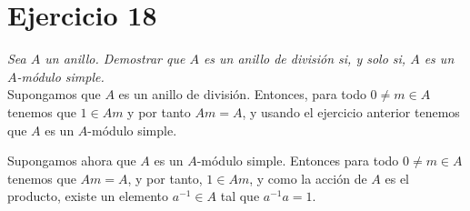 \section{Ejercicio 18}%
\label{sec:ejercicio_18}
\textit{Sea \(A\) un anillo. Demostrar que \(A\) es un anillo de división si, y solo si, \(A\) es un \(A\)-módulo simple.}\\

Supongamos que \(A\) es un anillo de división. Entonces, para todo \(0 \neq m \in A\) tenemos que  \(1 \in Am\) y por tanto  \(Am = A\), y usando el ejercicio anterior tenemos que  \(A\) es un \(A\)-módulo simple.

Supongamos ahora que \(A\) es un \(A\)-módulo simple. Entonces para todo \( 0\neq m \in A\) tenemos que \(Am = A\), y por tanto, \(1 \in Am\), y como la acción de \(A\) es el producto, existe un elemento \(a^{-1} \in A\) tal que  \(a^{-1}a = 1\).
